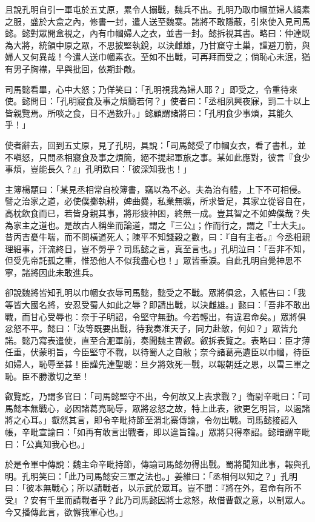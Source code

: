 且說孔明自引一軍屯於五丈原，累令人搦戰，魏兵不出。孔明乃取巾幗並婦人縞素之服，盛於大盒之內，修書一封，遣人送至魏寨。諸將不敢隱蔽，引來使入見司馬懿。懿對眾開盒視之，內有巾幗婦人之衣，並書一封。懿拆視其書。略曰：仲達既為大將，統領中原之眾，不思披堅執銳，以決雌雄，乃甘窟守土巢，謹避刀箭，與婦人又何異哉！今遣人送巾幗素衣。至如不出戰，可再拜而受之；倘恥心未泯，猶有男子胸襟，早與批回，依期卦敵。

司馬懿看畢，心中大怒；乃佯笑曰：「孔明視我為婦人耶？」即受之，令重待來使。懿問日：「孔明寢食及事之煩簡若何？」使者曰：「丞相夙興夜寐，罰二十以上皆親覽焉。所啖之食，日不過數升。」懿顧謂諸將曰：「孔明食少事煩，其能久乎！」

使者辭去，回到五丈原，見了孔明，具說：「司馬懿受了巾幗女衣，看了書札，並不嗔怒，只問丞相寢食及事之煩簡，絕不提起軍旅之事。某如此應對，彼言『食少事煩，豈能長久？』」孔明歎曰：「彼深知我也！」

主簿楊顒曰：「某見丞相常自校簿書，竊以為不必。夫為治有體，上下不可相侵。譬之治家之道，必使僕擲執耕，婢曲爨，私業無曠，所求皆足，其家立從容自在，高枕飲食而已，若皆身親其事，將形疲神困，終無一成。豈其智之不如婢僕哉？失為家主之道也。是故古人稱坐而論道，謂之『三公』；作而行之，謂之『士大夫』。昔丙吉憂牛喘，而不問橫道死人；陳平不知錢穀之數，曰：『自有主者。』今丞相親理細事，汗流終日，豈不勞乎？司馬懿之言，真至言也。」孔明泣曰：「吾非不知，但受先帝託孤之重，惟恐他人不似我盡心也！」眾皆垂淚。自此孔明自覺神思不寧，諸將因此未敢進兵。

卻說魏將皆知孔明以巾幗女衣辱司馬懿，懿受之不戰。眾將俱忿，入帳告曰：「我等皆大國名將，安忍受蜀人如此之辱？即請出戰，以決雌雄。」懿曰：「吾非不敢出戰，而甘心受辱也：奈于子明詔，令堅守無動。今若輕出，有違君命矣。」眾將俱忿怒不平。懿曰：「汝等既要出戰，待我奏准天子，同力赴敵，何如？」眾皆允諾。懿乃寫表遣使，直至合淝軍前，奏聞魏主曹叡。叡拆表覽之。表略曰：臣才薄任重，伏蒙明旨，今臣堅守不戰，以待蜀人之自敝；奈今諸葛亮遺臣以巾幗，待臣如婦人，恥辱至甚！臣謹先達聖聰：旦夕將效死一戰，以報朝廷之恩，以雪三軍之恥。臣不勝激切之至！

叡覽訖，乃謂多官曰：「司馬懿堅守不出，今何故又上表求戰？」衛尉辛毗曰：「司馬懿本無戰心，必因諸葛亮恥辱，眾將忿怒之故，特上此表，欲更乞明旨，以遏諸將之心耳。」叡然其言，即令辛毗持節至渭北寨傳諭，令勿出戰。司馬懿接詔入帳，辛毗宣諭曰：「如再有敢言出戰者，即以違旨論。」眾將只得奉詔。懿暗謂辛毗曰：「公真知我心也。」

於是令軍中傳說：魏主命辛毗持節，傳諭司馬懿勿得出戰。蜀將聞知此事，報與孔明。孔明笑曰：「此乃司馬懿安三軍之法也。」姜維曰：「丞相何以知之？」孔明曰：「彼本無戰心；所以請戰者，以示武於眾耳。豈不聞：『將在外，君命有所不受』？安有千里而請戰者乎？此乃司馬懿因將士忿怒，故借曹叡之意，以制眾人。今又播傳此言，欲懈我軍心也。」

